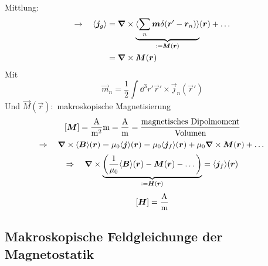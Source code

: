 \\
Mittlung:
\begin{align*}
\rightarrow \quad \langle \vec{j}_g \rangle &= \vabla \times \ub{\langle \sum_n \vec{m} \delta(\vec{r}' - \vec{r}_n) \rangle}_{\defeq \vec{M}(\vec{r})} (\vec{r}) + \dots \\
&= \vabla \times \vec{M}(\vec{r})
\end{align*}
Mit
$$ \vec{m}_n = \frac{1}{2} \int \dd^3 r' \vec{r}' \times \vec{j}_n(\vec{r}') $$
Und $ \vec{M} (\vec{r}) : $ makroskopische Magnetisierung
\begin{equation*}
\left[\bm{M}\right] = \frac{\textrm{A}}{\textrm{m}^2} \textrm{m} = \frac{\textrm{A}}{\textrm{m}} = \frac{\textrm{magnetisches Dipolmoment}}{\textrm{Volumen}}
\end{equation*}
\begin{equation*}
\Rightarrow \quad \bm{\nabla} \times \langle \bm{B} \rangle (\bm{r}) = \mu_0 \langle \bm{j} \rangle (\bm{r}) = \mu_0 \langle \bm{j}_f \rangle (\bm{r}) + \mu_0 \bm{\nabla} \times \bm{M}(\bm{r}) + \dots
\end{equation*}
\begin{equation*}
\Rightarrow \quad \vabla \times \ub{\left(\frac{1}{\mu_0} \langle \vec{B} \rangle (\vec{r})  - \vec{M} (\vec{r}) - \dots \right)}_{\defeq \vec{H}(\vec{r})} = \langle \vec{j}_f \rangle (\vec{r})
\end{equation*}
\begin{equation*}
\left[\bm{H}\right] = \frac{\textrm{A}}{\textrm{m}}
\end{equation*}

\subsection{Makroskopische Feldgleichunge der Magnetostatik}

